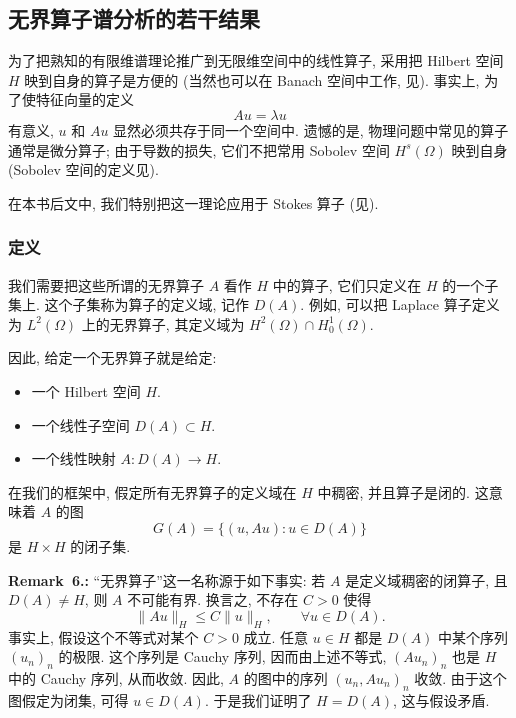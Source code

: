 \subsection{无界算子谱分析的若干结果}
\label{sec:chap2-unbounded-operator-spectral-analysis}
\renewcommand{\thestatement}{6.\number\numexpr\value{statement}-93\relax}
\renewcommand{\thechaptersixremark}{6.\arabic{chaptersixremark}}

为了把熟知的有限维谱理论推广到无限维空间中的线性算子, 采用把 Hilbert 空间 $H$ 映到自身的算子是方便的 (当然也可以在 Banach 空间中工作, 见). 事实上, 为了使特征向量的定义
\[
 Au=\lambda u
\]
有意义, $u$ 和 $Au$ 显然必须共存于同一个空间中. 遗憾的是, 物理问题中常见的算子通常是微分算子; 由于导数的损失, 它们不把常用 Sobolev 空间 $H^s(\Omega)$ 映到自身 (Sobolev 空间的定义见).

在本书后文中, 我们特别把这一理论应用于 Stokes 算子 (见).

\subsubsection{定义}
\label{subsec:chap2-unbounded-operator-definitions}

我们需要把这些所谓的无界算子 $A$ 看作 $H$ 中的算子, 它们只定义在 $H$ 的一个子集上. 这个子集称为算子的定义域, 记作 $D(A)$. 例如, 可以把 Laplace 算子定义为 $L^2(\Omega)$ 上的无界算子, 其定义域为 $H^2(\Omega)\cap H_0^1(\Omega)$.

因此, 给定一个无界算子就是给定:
\begin{itemize}
 \item 一个 Hilbert 空间 $H$.
 \item 一个线性子空间 $D(A)\subset H$.
 \item 一个线性映射 $A:D(A)\to H$.
\end{itemize}
在我们的框架中, 假定所有无界算子的定义域在 $H$ 中稠密, 并且算子是闭的. 这意味着 $A$ 的图
\[
 G(A)=\{(u,Au):u\in D(A)\}
\]
是 $H\times H$ 的闭子集.

\par\noindent{}\textbf{Remark~\thechaptersixremark:}\label{rem:chap2-unbounded-really-unbounded}\quad
``无界算子''这一名称源于如下事实: 若 $A$ 是定义域稠密的闭算子, 且 $D(A)\neq H$, 则 $A$ 不可能有界. 换言之, 不存在 $C>0$ 使得
\[
 \|Au\|_H\leq C\|u\|_H,\qquad\forall u\in D(A).
\]
事实上, 假设这个不等式对某个 $C>0$ 成立. 任意 $u\in H$ 都是 $D(A)$ 中某个序列 $(u_n)_n$ 的极限. 这个序列是 Cauchy 序列, 因而由上述不等式, $(Au_n)_n$ 也是 $H$ 中的 Cauchy 序列, 从而收敛. 因此, $A$ 的图中的序列 $(u_n,Au_n)_n$ 收敛. 由于这个图假定为闭集, 可得 $u\in D(A)$. 于是我们证明了 $H=D(A)$, 这与假设矛盾.

